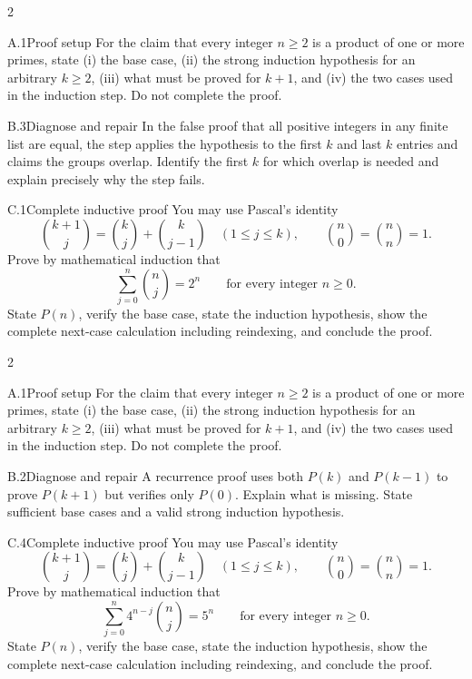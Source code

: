 \documentclass[9pt]{extarticle}
\begin{document}
\CoreWorkArea
\FormBreak
{}
\begin{multicols}{2}
\begin{CompactCoreProblem}{A.1}{Proof setup}
For the claim that every integer $n\ge2$ is a product of one or more primes, state (i) the base case, (ii) the strong induction hypothesis for an arbitrary $k\ge2$, (iii) what must be proved for $k+1$, and (iv) the two cases used in the induction step. Do not complete the proof.
\end{CompactCoreProblem}
\begin{CompactCoreProblem}{B.3}{Diagnose and repair}
In the false proof that all positive integers in any finite list are equal, the step applies the hypothesis to the first $k$ and last $k$ entries and claims the groups overlap. Identify the first $k$ for which overlap is needed and explain precisely why the step fails.
\end{CompactCoreProblem}
\end{multicols}
\begin{CompactCoreProblem}{C.1}{Complete inductive proof}
You may use Pascal's identity
\[
\binom{k+1}{j}=\binom{k}{j}+\binom{k}{j-1}
\quad(1\le j\le k),\qquad
\binom{n}{0}=\binom{n}{n}=1.
\]
Prove by mathematical induction that
\[
\sum_{j=0}^{n}\binom{n}{j}=2^n\qquad\text{for every integer }n\ge0.
\]
State $P(n)$, verify the base case, state the induction hypothesis, show the complete next-case calculation including reindexing, and conclude the proof.
\end{CompactCoreProblem}
\CoreWorkArea
\FormBreak
{}
\begin{multicols}{2}
\begin{CompactCoreProblem}{A.1}{Proof setup}
For the claim that every integer $n\ge2$ is a product of one or more primes, state (i) the base case, (ii) the strong induction hypothesis for an arbitrary $k\ge2$, (iii) what must be proved for $k+1$, and (iv) the two cases used in the induction step. Do not complete the proof.
\end{CompactCoreProblem}
\begin{CompactCoreProblem}{B.2}{Diagnose and repair}
A recurrence proof uses both $P(k)$ and $P(k-1)$ to prove $P(k+1)$ but verifies only $P(0)$. Explain what is missing. State sufficient base cases and a valid strong induction hypothesis.
\end{CompactCoreProblem}
\end{multicols}
\begin{CompactCoreProblem}{C.4}{Complete inductive proof}
You may use Pascal's identity
\[
\binom{k+1}{j}=\binom{k}{j}+\binom{k}{j-1}
\quad(1\le j\le k),\qquad
\binom{n}{0}=\binom{n}{n}=1.
\]
Prove by mathematical induction that
\[
\sum_{j=0}^{n} 4^{n-j}\binom{n}{j}=5^n\qquad\text{for every integer }n\ge0.
\]
State $P(n)$, verify the base case, state the induction hypothesis, show the complete next-case calculation including reindexing, and conclude the proof.
\end{CompactCoreProblem}
\end{document}
